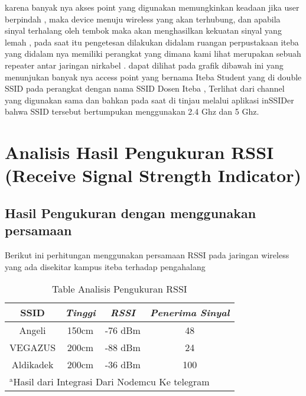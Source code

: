 \documentclass[conference]{IEEEtran}
\begin{document}
karena banyak nya akses point yang digunakan memungkinkan keadaan jika user berpindah , maka device menuju wireless yang akan terhubung,
dan apabila sinyal terhalang oleh tembok maka akan menghasilkan kekuatan sinyal yang lemah , pada saat itu pengetesan dilakukan didalam ruangan
perpustakaan iteba yang didalam nya memiliki perangkat yang dimana kami lihat merupakan sebuah repeater antar jaringan nirkabel .
dapat dilihat pada grafik dibawah ini yang menunjukan banyak nya access point yang bernama Iteba Student yang di double SSID pada perangkat dengan nama SSID
Dosen Iteba , Terlihat dari channel yang digunakan sama dan bahkan pada saat di tinjau melalui aplikasi inSSIDer bahwa SSID tersebut bertumpukan menggunakan 2.4 Ghz dan 5 Ghz.



\section{Analisis Hasil Pengukuran RSSI (Receive
Signal Strength Indicator)}
\subsection{Hasil Pengukuran dengan menggunakan persamaan}
Berikut ini perhitungan menggunakan persamaan RSSI pada jaringan wireless yang ada disekitar kampus iteba terhadap pengahalang



\begin{table}[htbp]
    \caption{Table Analisis Pengukuran RSSI}
    \begin{center}
    \begin{tabular}{|c|c|c|c|}
        \hline
    \textbf{SSID} & \textbf{\textit{Tinggi}}& \textbf{\textit{RSSI}}& \textbf{\textit{Penerima Sinyal}} \\
    \hline
    Angeli & 150cm& -76 dBm & 48  \\
    \hline
    VEGAZUS & 200cm& -88 dBm & 24  \\
    \hline
    Aldikadek & 200cm& -36 dBm & 100   \\
    \hline
    \multicolumn{4}{l}{$^{\mathrm{a}}$Hasil dari Integrasi Dari Nodemcu Ke telegram}
    \end{tabular}
    \label{tab1}
    \end{center}
    \end{table}
\end{document}
